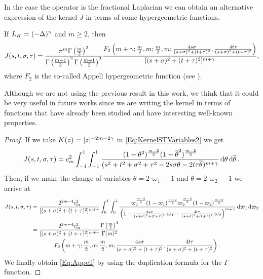 In the case the operator is the fractional Laplacian we can obtain an alternative expression of the
kernel $J$ in terms of some hypergeometric functions.
\begin{lemma}
\label{Lemma:Appell} If $L_K = (-\Delta)^\gamma$ and $m\geq 2$, then
\begin{equation}
\label{Eq:Appell}
J(s,t,\sigma,\tau) = \frac{\pi^m\Gamma\left(\frac{m}{2}\right)^2}{\Gamma\left(\frac{m-1}{2}\right)^2\Gamma\left(\frac{m+1}{2}\right)^2} \frac{F_2\left( m+\gamma;\frac{m}{2},m;\frac{m}{2},m;\frac{4s\sigma}{(s+\sigma)^2+(t+\tau)^2},\frac{4t\tau}{(s+\sigma)^2+(t+\tau)^2} \right)}{[(s+\sigma)^2+(t+\tau)^2]^{m+\gamma}},
\end{equation}
where $F_2$ is the so-called Appell hypergeometric function (see \cite{Appell}).
\end{lemma}
Although we are not using the previous result in this work, we think that it could be very useful in future
works since we are writing the kernel in terms of functions that have already been studied and have
interesting well-known properties.


\begin{proof}
If we take $K(z) = |z|^{-2m-2\gamma}$ in \eqref{Eq:KernelSTVariables2} we get
\begin{align*}
J(s,t,\sigma, \tau) = c_m ^2  \int_{-1}^1  \int_{-1}^1  \frac{(1-\theta^2)^{\frac{m-2}{2}} (1-\overline{\theta}^2)^{\frac{m-2}{2}}}{(s^2 + t^2 + \sigma^2 + \tau^2 -2 s \sigma \theta -2 t \tau \overline{\theta})^{m+\gamma}} \,\mathrm{d} \theta \,\mathrm{d} \overline{\theta}\,.
\end{align*}
Then, if we make the change of variables $\theta = 2\varpi_1-1$ and $\overline{\theta}=2\varpi_2-1$
we arrive at
\begin{align*}
J(s,t,\sigma, \tau) &= \frac{2^{2m-4} c_m^2}{[(s+\sigma)^2+(t+\tau)^2]^{m+\gamma}} \int_0^1 \int_0^1
\frac{\varpi_1^\frac{m-2}{2} (1-\varpi_1)^\frac{m-2}{2} \varpi_2^\frac{m-2}{2}
(1-\varpi_2)^\frac{m-2}{2}}{\left(1-\frac{4s\sigma}{(s+\sigma)^2+(t+\tau)^2}\,\varpi_1-\frac{4t\tau}{(s+\sigma)^2+(t+\tau)^2}\,\varpi_2
\right)^{m+\gamma}} \,\mathrm{d} \varpi_1 \,\mathrm{d} \varpi_2 \\
&= \frac{2^{2m-4} c_m^2}{[(s+\sigma)^2+(t+\tau)^2]^{m+\gamma}} \frac{\Gamma\left(\frac{m}{2} \right)^4}{\Gamma(m)^2} \\
& \quad \quad \quad \quad F_2\left( m+\gamma;\frac{m}{2},m;\frac{m}{2},m;\frac{4s\sigma}{(s+\sigma)^2+(t+\tau)^2},\frac{4t\tau}{(s+\sigma)^2+(t+\tau)^2} \right).
\end{align*}
We finally obtain \eqref{Eq:Appell} by using the duplication formula for the $\Gamma$-function.
\end{proof}

